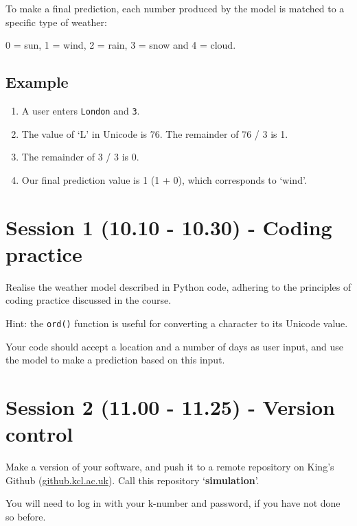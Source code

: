 \documentclass{article}
\begin{document}
To make a final prediction, each number produced by the model is matched to
a specific type of weather:

0 = sun, 1 = wind, 2 = rain, 3 = snow and 4 = cloud.

\subsection{Example}

\begin{enumerate}

    \item A user enters \texttt{London} and \texttt{3}.
    
    \item The value of `L' in Unicode is 76. The remainder of 76 / 3 is 1.
    
    \item The remainder of 3 / 3 is 0.
    
    \item Our final prediction value is 1 (1 + 0), which corresponds to `wind'.

\end{enumerate}

\section{Session 1 (10.10 - 10.30) - Coding practice}

Realise the weather model described in Python code, adhering to the principles
of coding practice discussed in the course.

Hint: the \texttt{ord()} function is
useful for converting a character to its Unicode value.

Your code should accept a location and a number of days as user input,
and use the model to make a prediction based on this input.

\section{Session 2 (11.00 - 11.25) - Version control}

Make a version of your software, and push it to a remote repository
on King's Github (\href{https://github.kcl.ac.uk/}{github.kcl.ac.uk}).
Call this repository `\textbf{simulation}'.

You will need to log in with your k-number and password, if you
have not done so before.
\end{document}
